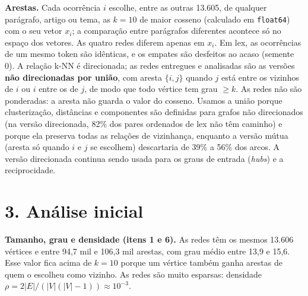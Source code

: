 \documentclass[11pt,a4paper]{article}
\begin{document}
\textbf{Arestas.} Cada ocorrência $i$ escolhe, entre as outras 13.605, de qualquer parágrafo,
artigo ou tema, as $k=10$ de maior cosseno (calculado em \texttt{float64}) com o seu
vetor $x_i$; a comparação entre parágrafos diferentes acontece só no espaço dos
vetores. As quatro redes diferem apenas em $x_i$. Em lex, as ocorrências de um mesmo token
são idênticas, e os empates são desfeitos ao acaso (semente 0). A relação k-NN é
direcionada; as redes entregues e analisadas são as versões \textbf{não direcionadas por
união}, com aresta $\{i,j\}$ quando $j$ está entre os vizinhos de $i$ ou $i$ entre os de
$j$, de modo que todo vértice tem grau $\ge k$. As redes não são ponderadas: a aresta não
guarda o valor do cosseno. Usamos a união porque clusterização, distâncias e componentes são
definidas para grafos não direcionados (na versão direcionada, 82\% dos pares ordenados de
lex não têm caminho) e porque ela preserva todas as relações de vizinhança, enquanto a versão
mútua (aresta só quando $i$ e $j$ se escolhem) descartaria de 39\% a 56\% dos arcos. A
versão direcionada continua sendo usada para os graus de entrada (\textit{hubs}) e a
reciprocidade.

\section*{3. Análise inicial}

\begin{table}[h]
\centering
\small
\setlength{\tabcolsep}{3.5pt}
\caption{Métricas das quatro redes ($k=10$, união).
$^\ast$Calculadas de forma exata sobre todos os pares de vértices da maior componente. As duas
últimas linhas comparam as redes; o Jaccard é $|E\cap E'|/|E\cup E'|$, com $E$ as arestas da
rede e $E'$ as da coluna anterior.}
\label{tab:metricas}

\end{table}

\textbf{Tamanho, grau e densidade (itens 1 e 6).} As redes têm os mesmos 13.606 vértices
e entre 94,7 mil e 106,3 mil arestas, com grau médio entre 13,9 e 15,6. Esse valor
fica acima de $k=10$ porque um vértice também ganha arestas de quem o escolheu como
vizinho. As redes são muito esparsas: densidade
$\rho = 2|E|/(|V|(|V|-1)) \approx 10^{-3}$.
\end{document}
